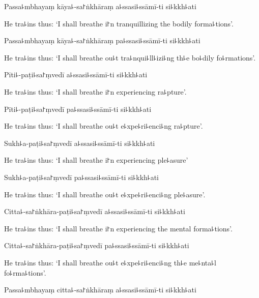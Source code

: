 Passa꜕mbhayaṃ kāya꜕-sa꜓ṅkhāraṃ a꜕ssasi꜕ssāmī-ti si꜕kkh꜕ati

\begin{english}
  He tra꜕ins thus: `I shall breathe i꜓n tranquillizing the bodily forma꜕tions'.
\end{english}

Passa꜕mbhayaṃ kāya꜕-sa꜓ṅkhāraṃ pa꜕ssasi꜕ssāmī-ti si꜕kkh꜕ati

\begin{english}
  He tra꜕ins thus: `I shall breathe ou꜕t tra꜕nqui꜕ll꜕izi꜕ng th꜕e bo꜕dily fo꜕rmations'.
\end{english}

Pīti꜕-paṭi꜕sa꜓ṃvedī a꜕ssasi꜕ssāmī-ti si꜕kkh꜕ati

\begin{english}
  He tra꜕ins thus: `I shall breathe i꜓n experiencing ra꜕pture'.
\end{english}

Pīti꜕-paṭi꜕sa꜓ṃvedī pa꜕ssasi꜕ssāmī-ti si꜕kkh꜕ati

\begin{english}
  He tra꜕ins thus: `I shall breathe ou꜕t e꜕xpe꜕ri꜕enci꜕ng ra꜕pture'.
\end{english}

Sukh꜕a-paṭi꜕sa꜓ṃvedī a꜕ssasi꜕ssāmī-ti si꜕kkh꜕ati

\begin{english}
  He tra꜕ins thus: `I shall breathe i꜓n experiencing ple꜕asure'
\end{english}

Sukh꜕a-paṭi꜕sa꜓ṃvedī pa꜕ssasi꜕ssāmī-ti si꜕kkh꜕ati

\begin{english}
  He tra꜕ins thus: `I shall breathe ou꜕t e꜕xpe꜕ri꜕enci꜕ng ple꜕asure'.
\end{english}

Citta꜕-sa꜓ṅkhāra-paṭi꜕sa꜓ṃvedī a꜕ssasi꜕ssāmī-ti si꜕kkh꜕ati

\begin{english}
  He tra꜕ins thus: `I shall breathe i꜓n experiencing the mental forma꜕tions'.
\end{english}

Citta꜕-sa꜓ṅkhāra-paṭi꜕sa꜓ṃvedī pa꜕ssasi꜕ssāmī-ti si꜕kkh꜕ati

\begin{english}
  He tra꜕ins thus: `I shall breathe ou꜕t e꜕xpe꜕ri꜕enci꜕ng th꜕e me꜕nta꜕l fo꜕rma꜕tions'.
\end{english}

Passa꜕mbhayaṃ citta꜕-sa꜓ṅkhāraṃ a꜕ssasi꜕ssāmī-ti si꜕kkh꜕ati

